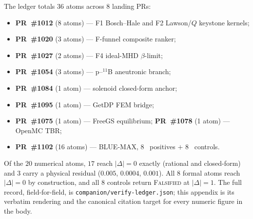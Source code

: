 The ledger totals $36$ atoms across $8$ landing PRs:
\begin{itemize}
  \item \textbf{PR~\#1012} (8 atoms) --- F1 Bosch--Hale and F2 Lawson/$Q$
        keystone kernels;
  \item \textbf{PR~\#1020} (3 atoms) --- F-funnel composite ranker;
  \item \textbf{PR~\#1027} (2 atoms) --- F4 ideal-MHD $\beta$-limit;
  \item \textbf{PR~\#1054} (3 atoms) --- p--$^{11}$B aneutronic branch;
  \item \textbf{PR~\#1084} (1 atom) --- solenoid closed-form anchor;
  \item \textbf{PR~\#1095} (1 atom) --- GetDP FEM bridge;
  \item \textbf{PR~\#1075} (1 atom) --- FreeGS equilibrium;
        \textbf{PR~\#1078} (1 atom) --- OpenMC TBR;
  \item \textbf{PR~\#1102} (16 atoms) --- BLUE-MAX, 8 \tierBlue\ positives
        $+$ 8 \tierRed\ controls.
\end{itemize}
Of the $20$ numerical atoms, $17$ reach $|\Delta|=0$ exactly (rational
and closed-form) and $3$ carry a physical residual ($0.005$, $0.0004$,
$0.001$). All $8$ formal atoms reach $|\Delta|=0$ by construction, and
all $8$ controls return \textsc{Falsified} at $|\Delta|=1$. The full
record, field-for-field, is \texttt{companion/verify-ledger.json}; this
appendix is its verbatim rendering and the canonical citation target for
every numeric figure in the body.
